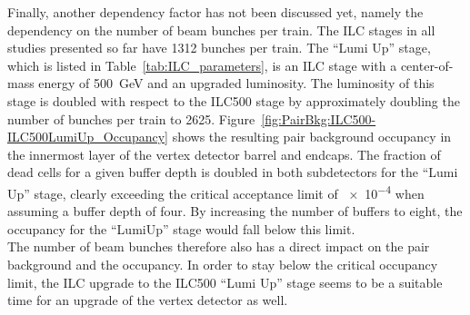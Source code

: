 Finally, another dependency factor has not been discussed yet, namely the dependency on the number of beam bunches per train.
The ILC stages in all studies presented so far have \num{1312} bunches per train.
The ``Lumi Up'' stage, which is listed in Table~\ref{tab:ILC_parameters}, is an ILC stage with a center-of-mass energy of \SI{500}{\GeV} and an upgraded luminosity.
The luminosity of this stage is doubled with respect to the ILC500 stage by approximately doubling the number of bunches per train to \num{2625}.
Figure~\ref{fig:PairBkg:ILC500-ILC500LumiUp_Occupancy} shows the resulting pair background occupancy in the innermost layer of the vertex detector barrel and endcaps.
The fraction of dead cells for a given buffer depth is doubled in both subdetectors for the ``Lumi Up'' stage, clearly exceeding the critical acceptance limit of \num{e-4} when assuming a buffer depth of four.
By increasing the number of buffers to eight, the occupancy for the ``LumiUp'' stage would fall below this limit.
\\The number of beam bunches therefore also has a direct impact on the pair background and the \sid occupancy.
In order to stay below the critical occupancy limit, the ILC upgrade to the ILC500 ``Lumi Up'' stage seems to be a suitable time for an upgrade of the \sid vertex detector as well.
